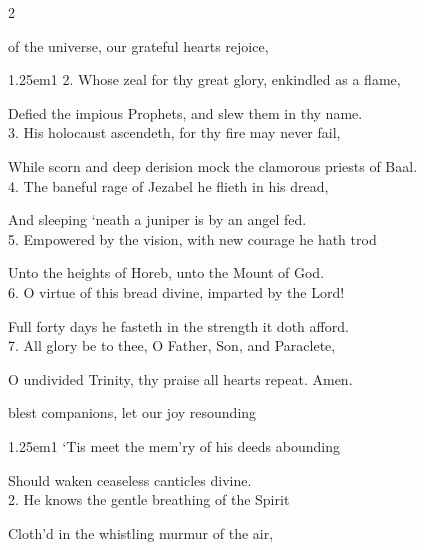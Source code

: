 \begin{paracol}{2}
\sloppy

\mattinsInvitatoryHymn

 of the universe, our grateful hearts rejoice,


\begin{hangparas}{1.25em}{1}
2. Whose zeal for thy great glory, enkindled as a flame,

Defied the impious Prophets, and slew them in thy name.\\

3. His holocaust ascendeth, for thy fire may never fail,

While scorn and deep derision mock the clamorous priests of Baal.\\

4. The baneful rage of Jezabel he flieth in his dread,

And sleeping `neath a juniper is by an angel fed.\\

5. Empowered by the vision, with new courage he hath trod

Unto the heights of Horeb, unto the Mount of God.\\

6. O virtue of this bread divine, imparted by the Lord!

Full forty days he fasteth in the strength it doth afford.\\

7. All glory be to thee, O Father, Son, and Paraclete,

O undivided Trinity, thy praise all hearts repeat. Amen.
\end{hangparas}

\switchcolumn

\mattinsOfficeHymn
{} blest companions, let our joy resounding


\begin{hangparas}{1.25em}{1}
`Tis meet the mem'ry of his deeds abounding

Should waken ceaseless canticles divine.\\

2. He knows the gentle breathing of the Spirit

Cloth'd in the whistling murmur of the air,


\end{hangparas}
\end{paracol}
